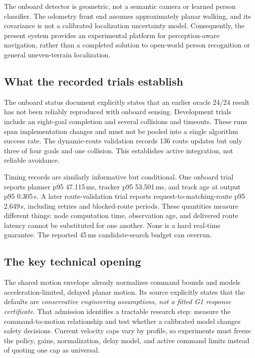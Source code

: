 \documentclass[11pt,a4paper]{article}
\begin{document}
The onboard detector is geometric, not a semantic camera or learned person
classifier. The odometry front end assumes approximately planar walking,
and its covariance is not a calibrated localization uncertainty model.
Consequently, the present system provides an experimental platform for
perception-aware navigation, rather than a completed solution to open-world
person recognition or general uneven-terrain localization.

\subsection{What the recorded trials establish}
The onboard status document explicitly states that an earlier oracle 24/24
result has not been reliably reproduced with onboard sensing. Development
trials include an eight-goal completion and several collisions and timeouts.
These runs span implementation changes and must not be pooled into a
single algorithm success rate. The dynamic-route validation records
136 route updates but only three of four goals and one collision.
This establishes active integration, not reliable avoidance.

Timing records are similarly informative but conditional. One onboard trial
reports planner p95 47.115\,ms, tracker p95 53.501\,ms, and track age at output
p95 0.305\,s. A later route-validation trial reports request-to-matching-route
p95 2.649\,s, including retries and blocked-route periods. These quantities
measure different things: node computation time, observation age, and delivered
route latency cannot be substituted for one another. None is a hard real-time
guarantee. The reported 45\,ms candidate-search budget can overrun.

\subsection{The key technical opening}
The shared motion envelope already normalizes command bounds and models
acceleration-limited, delayed planar motion. Its source explicitly states that
the defaults are \emph{conservative engineering assumptions, not a fitted G1
response certificate}. That admission identifies a tractable research step:
measure the command-to-motion relationship and test whether a calibrated
model changes safety decisions. Current velocity caps vary by profile, so
experiments must freeze the policy, gains, normalization, delay model, and
active command limits instead of quoting one cap as universal.
\end{document}
